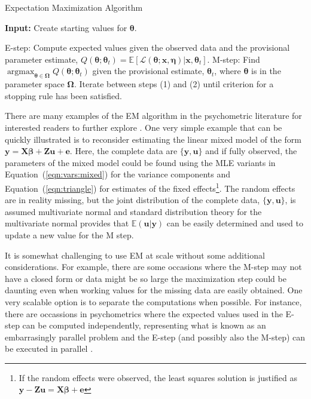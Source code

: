 \documentclass[12pt]{article}
\DeclareMathOperator*{\argmax}{argmax}
\begin{document}
\begin{algorithm}
\caption{Expectation Maximization Algorithm}
\label{algo:em}
	\hspace*{\algorithmicindent} \textbf{Input:} Create starting values for $\bm{\theta}$.
\begin{algorithmic}[1]
	\State E-step: Compute expected values given the observed data and the provisional parameter estimate, $Q(\bm{\theta};\bm{\theta}_t) = \mathbb{E}[\mathcal{L}(\bm{\theta};\bm{x},\bm{\eta})|\bm{x},\bm{\theta}_t]$.
	\State M-step: Find $\argmax_{\bm{\theta} \in \bm{\Omega}} Q(\bm{\theta};\bm{\theta}_t)$ given the provisional estimate, $\bm{\theta}_t$, where $\bm{\theta}$ is in the parameter space $\bm{\Omega}$.
	\State Iterate between steps (1) and (2) until criterion for a stopping rule has been satisfied. 
\end{algorithmic}
\end{algorithm}

There are many examples of the EM algorithm in the psychometric literature for interested readers to further explore \cite{Hsu1999TheRB}. One very simple example that can be quickly illustrated is to reconsider estimating the linear mixed model of the form $\bm{y} = \bm{X}\bm{\beta} + \bm{Z}\bm{u} + \bm{e}$. Here, the complete data are $\{\bm{y}, \bm{u}\}$ and if fully observed, the parameters of the mixed model could be found using the MLE variants in Equation~(\ref{eqn:vars:mixed}) for the variance components and Equation~(\ref{eqn:triangle}) for estimates of the fixed effects\footnote{If the random effects were observed, the least squares solution is justified as $\bm{y} -\bm{Z}\bm{u} = \bm{X}\bm{\beta} + \bm{e}$}. The random effects are in reality missing, but the joint distribution of the complete data, $\{\bm{y}, \bm{u}\}$, is assumed multivariate normal and standard distribution theory for the multivariate normal provides that $\mathbb{E}(\bm{u}|\bm{y})$ can be easily determined \cite{mcandsearle:2001} and used to update a new value for the M step.  

It is somewhat challenging to use EM at scale without some additional considerations. For example, there are some occasions where the M-step may not have a closed form or data might be so large the maximization step could be daunting even when working values for the missing data are easily obtained. One very scalable option is to separate the computations when possible. For instance, there are occassions in psychometrics where the expected values used in the E-step can be computed independently, representing what is known as an embarrasingly parallel problem and the E-step (and possibly also the M-step) can be executed in parallel \cite{lee}. 
\end{document}
